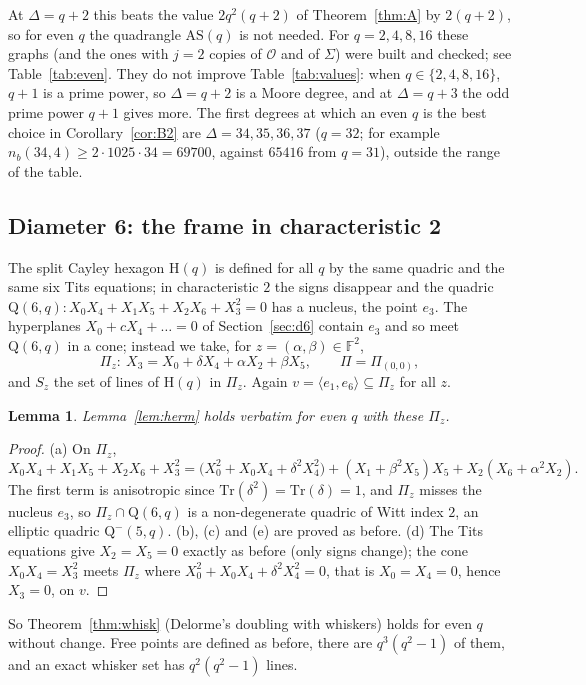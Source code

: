 \documentclass[11pt]{amsart}
\newtheorem{lemma}[theorem]{Lemma}
\theoremstyle{definition}
\theoremstyle{remark}
\newcommand{\cO}{\mathcal{O}}
\newcommand{\F}{\mathbb{F}}
\newcommand{\Hq}{\mathrm{H}}
\newcommand{\AS}{\mathrm{AS}}
\newcommand{\Qf}{\mathrm{Q}}
\newcommand{\Tr}{\mathrm{Tr}}
\begin{document}
At $\Delta=q+2$ this beats the value $2q^2(q+2)$ of Theorem~\ref{thm:A} by $2(q+2)$, so for even $q$ the quadrangle $\AS(q)$ is not needed. For $q=2,4,8,16$ these graphs (and the ones with $j=2$ copies of $\cO$ and of $\Sigma$) were built and checked; see Table~\ref{tab:even}. They do not improve Table~\ref{tab:values}: when $q\in\{2,4,8,16\}$, $q+1$ is a prime power, so $\Delta=q+2$ is a Moore degree, and at $\Delta=q+3$ the odd prime power $q+1$ gives more. The first degrees at which an even $q$ is the best choice in Corollary~\ref{cor:B2} are $\Delta=34,35,36,37$ ($q=32$; for example $n_b(34,4)\ge 2\cdot1025\cdot34=69700$, against $65416$ from $q=31$), outside the range of the table.

\subsection{Diameter 6: the frame in characteristic 2}\label{sec:even6}
The split Cayley hexagon $\Hq(q)$ is defined for all $q$ by the same quadric and the same six Tits equations; in characteristic $2$ the signs disappear and the quadric $\Qf(6,q)\colon X_0X_4+X_1X_5+X_2X_6+X_3^2=0$ has a nucleus, the point $e_3$. The hyperplanes $X_0+cX_4+\dots=0$ of Section~\ref{sec:d6} contain $e_3$ and so meet $\Qf(6,q)$ in a cone; instead we take, for $z=(\alpha,\beta)\in\F^2$,
\[
\Pi_z\colon\ X_3=X_0+\delta X_4+\alpha X_2+\beta X_5,\qquad \Pi=\Pi_{(0,0)},
\]
and $S_z$ the set of lines of $\Hq(q)$ in $\Pi_z$. Again $v=\langle e_1,e_6\rangle\subseteq\Pi_z$ for all $z$.

\begin{lemma}\label{lem:herm2}
Lemma~\ref{lem:herm} holds verbatim for even $q$ with these $\Pi_z$.
\end{lemma}

\begin{proof}
(a) On $\Pi_z$,
\[
X_0X_4+X_1X_5+X_2X_6+X_3^2=\bigl(X_0^2+X_0X_4+\delta^2X_4^2\bigr)+(X_1+\beta^2X_5)X_5+X_2(X_6+\alpha^2X_2).
\]
The first term is anisotropic since $\Tr(\delta^2)=\Tr(\delta)=1$, and $\Pi_z$ misses the nucleus $e_3$, so $\Pi_z\cap\Qf(6,q)$ is a non-degenerate quadric of Witt index $2$, an elliptic quadric $\Qf^-(5,q)$. (b), (c) and (e) are proved as before. (d) The Tits equations give $X_2=X_5=0$ exactly as before (only signs change); the cone $X_0X_4=X_3^2$ meets $\Pi_z$ where $X_0^2+X_0X_4+\delta^2X_4^2=0$, that is $X_0=X_4=0$, hence $X_3=0$, on $v$.
\end{proof}

So Theorem~\ref{thm:whisk} (Delorme's doubling with whiskers) holds for even $q$ without change. Free points are defined as before, there are $q^3(q^2-1)$ of them, and an exact whisker set has $q^2(q^2-1)$ lines.
\end{document}
